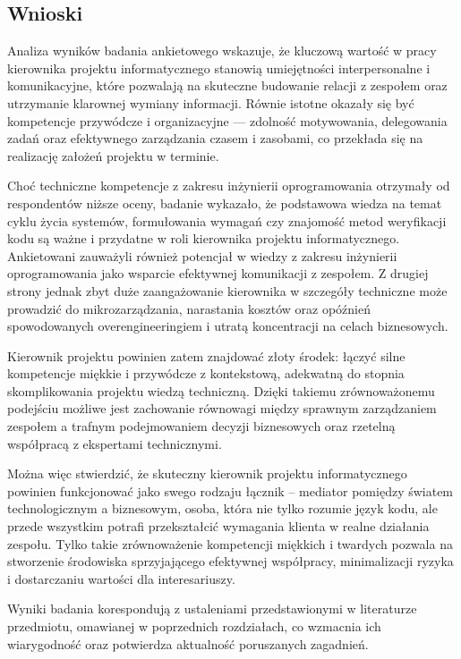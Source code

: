 \subsection{Wnioski}

Analiza wyników badania ankietowego wskazuje, że kluczową wartość w pracy kierownika projektu informatycznego stanowią umiejętności interpersonalne i komunikacyjne, które pozwalają na skuteczne budowanie relacji z zespołem oraz utrzymanie klarownej wymiany informacji. Równie istotne okazały się być kompetencje przywódcze i organizacyjne — zdolność motywowania, delegowania zadań oraz efektywnego zarządzania czasem i zasobami, co przekłada się na realizację założeń projektu w terminie. 

Choć techniczne kompetencje z zakresu inżynierii oprogramowania otrzymały od respondentów niższe oceny, badanie wykazało, że podstawowa wiedza na temat cyklu życia systemów, formułowania wymagań czy znajomość metod weryfikacji kodu są ważne i przydatne w roli kierownika projektu informatycznego. Ankietowani zauważyli również potencjał w wiedzy z zakresu inżynierii oprogramowania jako wsparcie efektywnej komunikacji z zespołem. Z drugiej strony jednak zbyt duże zaangażowanie kierownika w szczegóły techniczne może prowadzić do mikrozarządzania, narastania kosztów oraz opóźnień spowodowanych overengineeringiem i utratą koncentracji na celach biznesowych. 

Kierownik projektu powinien zatem znajdować złoty środek: łączyć silne kompetencje miękkie i przywódcze z kontekstową, adekwatną do stopnia skomplikowania projektu wiedzą techniczną. Dzięki takiemu zrównoważonemu podejściu możliwe jest zachowanie równowagi między sprawnym zarządzaniem zespołem a trafnym podejmowaniem decyzji biznesowych oraz rzetelną współpracą z ekspertami technicznymi.

Można więc stwierdzić, że skuteczny kierownik projektu informatycznego powinien funkcjonować jako swego rodzaju łącznik – mediator pomiędzy światem technologicznym a biznesowym, osoba, która nie tylko rozumie język kodu, ale przede wszystkim potrafi przekształcić wymagania klienta w realne działania zespołu. Tylko takie zrównoważenie kompetencji miękkich i twardych pozwala na stworzenie środowiska sprzyjającego efektywnej współpracy, minimalizacji ryzyka i dostarczaniu wartości dla interesariuszy.

Wyniki badania korespondują z ustaleniami przedstawionymi w literaturze przedmiotu, omawianej w poprzednich rozdziałach, co wzmacnia ich wiarygodność oraz potwierdza aktualność poruszanych zagadnień.